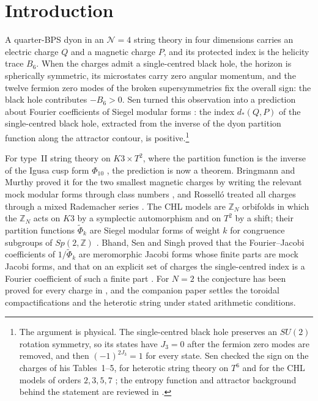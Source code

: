 \documentclass[mathematics,article,submit,pdftex,oneauthor]{Definitions/mdpi}
\numberwithin{equation}{section}
\theoremstyle{plain}
\theoremstyle{remark}
\newcommand{\Z}{\mathbb{Z}}
\newcommand{\tPhi}{\widetilde{\Phi}}
\begin{document}
\section{Introduction}

A quarter-BPS dyon in an $\mathcal N=4$ string theory in four dimensions carries an electric charge $Q$ and a magnetic charge $P$, and its protected index is the helicity trace $B_6$. When the charges admit a single-centred black hole, the horizon is spherically symmetric, its microstates carry zero angular momentum, and the twelve fermion zero modes of the broken supersymmetries fix the overall sign: the black hole contributes $-B_6>0$. Sen turned this observation into a prediction about Fourier coefficients of Siegel modular forms \cite{Sen11}: the index $d_*(Q,P)$ of the single-centred black hole, extracted from the inverse of the dyon partition function along the attractor contour, is positive.\footnote{The argument is physical. The single-centred black hole preserves an $SU(2)$ rotation symmetry, so its states have $J_3=0$ after the fermion zero modes are removed, and then $(-1)^{2J_3}=1$ for every state. Sen checked the sign on the charges of his Tables~1--5, for heterotic string theory on $T^6$ and for the CHL models of orders $2,3,5,7$ \cite{Sen11}; the entropy function and attractor background behind the statement are reviewed in \cite{Sen08}.}

For type~II string theory on $K3\times T^2$, where the partition function is the inverse of the Igusa cusp form $\Phi_{10}$ \cite{DVV97}, the prediction is now a theorem. Bringmann and Murthy proved it for the two smallest magnetic charges by writing the relevant mock modular forms through class numbers \cite{BM13}, and Rossell\'o treated all charges through a mixed Rademacher series \cite{Ros24}. The CHL models \cite{CHL95} are $\Z_N$ orbifolds in which the $\Z_N$ acts on $K3$ by a symplectic automorphism and on $T^2$ by a shift; their partition functions $\tPhi_k$ are Siegel modular forms of weight $k$ for congruence subgroups of $Sp(2,\Z)$ \cite{JS06,DJS06}. Bhand, Sen and Singh proved that the Fourier--Jacobi coefficients of $1/\tPhi_k$ are meromorphic Jacobi forms whose finite parts are mock Jacobi forms, and that on an explicit set of charges the single-centred index is a Fourier coefficient of such a finite part \cite{BSS25}. For $N=2$ the conjecture has been proved for every charge in \cite{Bha26a}, and the companion paper \cite{Bha26b} settles the toroidal compactifications and the heterotic string under stated arithmetic conditions.
\end{document}
